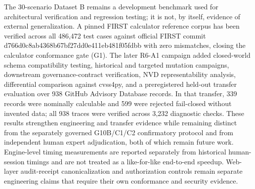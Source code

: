 \documentclass[11pt,a4paper,oneside]{book}
\begin{document}
The 30-scenario Dataset B remains a development benchmark used for architectural verification and regression testing; it is not, by itself, evidence of external generalization. A pinned FIRST calculator reference corpus has been verified across all 486,472 test cases against official FIRST commit d766d0c8ab4368b67bf27dd0e411eb481f05fdbb with zero mismatches, closing the calculator conformance gate (G1). The later R6-A1 campaign added closed-world schema compatibility testing, historical and targeted mutation campaigns, downstream governance-contract verification, NVD representability analysis, differential comparison against cvss4py, and a preregistered held-out transfer evaluation over 938 GitHub Advisory Database records. In that transfer, 339 records were nominally calculable and 599 were rejected fail-closed without invented data; all 938 traces were verified across 3,232 diagnostic checks. These results strengthen engineering and transfer evidence while remaining distinct from the separately governed G10B/C1/C2 confirmatory protocol and from independent human expert adjudication, both of which remain future work. Engine-level timing measurements are reported separately from historical human-session timings and are not treated as a like-for-like end-to-end speedup. Web-layer audit-receipt canonicalization and authorization controls remain separate engineering claims that require their own conformance and security evidence.

\mainmatter











\appendix




\backmatter



\end{document}
